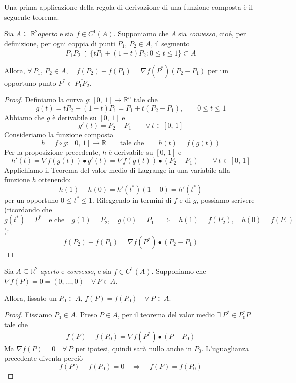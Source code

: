 Una prima applicazione della regola di derivazione di una funzione composta è il seguente teorema.

\begin{thm}
Sia $A \subseteq \mathbb{R}^2 aperto$ e sia $f \in C^1(A)$. Supponiamo che $A$ sia \emph{convesso}, cioé, per definizione, per ogni coppia di punti $P_1,\,P_2 \in A$, il segmento
$$\overline{P_1P_2} \doteqdot \lbrace tP_1+(1-t)P_2 : 0 \leq t \leq 1 \rbrace \subset A$$

\begin{center}
\def\svgwidth{8cm}

\end{center}

Allora, $\forall \, P_1,\,P_2 \in A, \quad f(P_2)-f(P_1) = \nabla f(P^*)(P_2-P_1)$ per un opportuno punto $P^* \in \overline{P_1P_2}$.
\end{thm}
\begin{proof}
Definiamo la curva $g:[0,\,1] \rightarrow \mathbb{R}^n$ tale che
$$
g(t) = tP_2 + (1-t)P_1 = P_1 + t(P_2-P_1), \qquad 0 \leq t \leq 1
$$
Abbiamo che $g$ è derivabile su $[0,\,1]$ e
$$
g'(t) = P_2-P_1 \qquad \forall \, t \in [0,\,1]
$$
Consideriamo la funzione composta
$$
h = f \circ g : [0,\,1] \rightarrow \mathbb{R} \qquad \text{tale che} \qquad h(t) = f(g(t))
$$
Per la proposizione precedente, $h$ è derivabile su $[0,\,1]$ e
$$
h'(t) = \nabla f(g(t)) \bullet g'(t) = \nabla f(g(t)) \bullet (P_2 - P_1) \qquad \forall \, t \in [0,\,1]
$$
Applichiamo il Teorema del valor medio di Lagrange in una variabile alla funzione $h$ ottenendo:
$$
h(1)-h(0) = h'(t^*)(1-0) = h'(t^*)
$$
per un opportuno $0 \leq t^* \leq 1$. Rileggendo in termini di $f$ e di $g$, possiamo scrivere (ricordando che $g(t^*) = P^* \quad \text{e che} \quad g(1)=P_2, \quad g(0) = P_1 \quad \Longrightarrow \quad h(1) = f(P_2), \quad h(0) = f(P_1)$):
$$
f(P_2) - f(P_1) = \nabla f(P^*) \bullet (P_2-P_1)
$$
\end{proof}

\begin{cor}
Sia $A \subseteq \mathbb{R}^2$ \emph{aperto} e \emph{convesso}, e sia $f \in C^1(A)$. Supponiamo che $\nabla f(P) = \underline{0} = (0,\ldots,0) \quad \forall \, P \in A$.

Allora, fissato un $P_0 \in A$, $f(P)=f(P_0) \quad \forall \, P \in A$.
\end{cor}
\begin{proof}
Fissiamo $P_0 \in A$. Preso $P \in A$, per il teorema del valor medio $\exists \, P^* \in \overline{P_0P}$ tale che
$$
f(P) - f(P_0) = \nabla f(P^*) \bullet (P-P_0)
$$
Ma $\nabla f(P) = 0 \quad \forall \, P$ per ipotesi, quindi sarà nullo anche in $P_0$. L'uguaglianza precedente diventa perciò
$$
f(P) - f(P_0) = 0 \quad \Longrightarrow \quad f(P) = f(P_0) 
$$ 
\end{proof}

